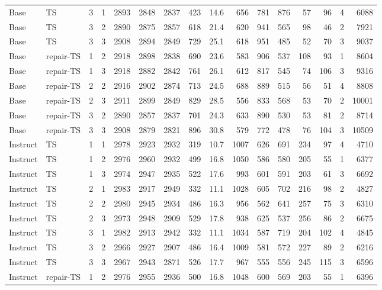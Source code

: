 \begin{landscape}
{\begin{longtable}{@{}llccrrrrrrrrrrrr@{}}
Base & TS & 3 & 1 & 2893 & 2848 & 2837 & 423 & 14.6 & 656 & 781 & 876 & 57 & 96 & 4 & 6088\\
Base & TS & 3 & 2 & 2890 & 2875 & 2857 & 618 & 21.4 & 620 & 941 & 565 & 98 & 46 & 2 & 7921\\
Base & TS & 3 & 3 & 2908 & 2894 & 2849 & 729 & 25.1 & 618 & 951 & 485 & 52 & 70 & 3 & 9037\\
Base & repair-TS & 1 & 2 & 2918 & 2898 & 2838 & 690 & 23.6 & 583 & 906 & 537 & 108 & 93 & 1 & 8604\\
Base & repair-TS & 1 & 3 & 2918 & 2882 & 2842 & 761 & 26.1 & 612 & 817 & 545 & 74 & 106 & 3 & 9316\\
Base & repair-TS & 2 & 2 & 2916 & 2902 & 2874 & 713 & 24.5 & 688 & 889 & 515 & 56 & 51 & 4 & 8808\\
Base & repair-TS & 2 & 3 & 2911 & 2899 & 2849 & 829 & 28.5 & 556 & 833 & 568 & 53 & 70 & 2 & 10001\\
Base & repair-TS & 3 & 2 & 2890 & 2857 & 2837 & 701 & 24.3 & 633 & 890 & 530 & 53 & 81 & 2 & 8714\\
Base & repair-TS & 3 & 3 & 2908 & 2879 & 2821 & 896 & 30.8 & 579 & 772 & 478 & 76 & 104 & 3 & 10509\\
Instruct & TS & 1 & 1 & 2978 & 2923 & 2932 & 319 & 10.7 & 1007 & 626 & 691 & 234 & 97 & 4 & 4710\\
Instruct & TS & 1 & 2 & 2976 & 2960 & 2932 & 499 & 16.8 & 1050 & 586 & 580 & 205 & 55 & 1 & 6377\\
Instruct & TS & 1 & 3 & 2974 & 2947 & 2935 & 522 & 17.6 & 993 & 601 & 591 & 203 & 61 & 3 & 6692\\
Instruct & TS & 2 & 1 & 2983 & 2917 & 2949 & 332 & 11.1 & 1028 & 605 & 702 & 216 & 98 & 2 & 4827\\
Instruct & TS & 2 & 2 & 2980 & 2945 & 2934 & 486 & 16.3 & 956 & 562 & 641 & 257 & 75 & 3 & 6310\\
Instruct & TS & 2 & 3 & 2973 & 2948 & 2909 & 529 & 17.8 & 938 & 625 & 537 & 256 & 86 & 2 & 6675\\
Instruct & TS & 3 & 1 & 2982 & 2913 & 2942 & 332 & 11.1 & 1034 & 587 & 719 & 204 & 102 & 4 & 4845\\
Instruct & TS & 3 & 2 & 2966 & 2927 & 2907 & 486 & 16.4 & 1009 & 581 & 572 & 227 & 89 & 2 & 6216\\
Instruct & TS & 3 & 3 & 2967 & 2943 & 2871 & 526 & 17.7 & 967 & 555 & 556 & 245 & 115 & 3 & 6596\\
Instruct & repair-TS & 1 & 2 & 2976 & 2955 & 2936 & 500 & 16.8 & 1048 & 600 & 569 & 203 & 55 & 1 & 6396\\

\end{longtable}}
\end{landscape}
